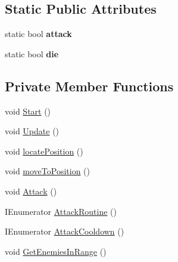\subsection*{Static Public Attributes}
\begin{DoxyCompactItemize}
\item 
\mbox{\label{class_click_to_move_a1c210864eeb2d4b60b6ca933b0aa6b2d}} 
static bool {\bfseries attack}
\item 
\mbox{\label{class_click_to_move_a263b8d7596f06f4c3cfa4219f1c728cc}} 
static bool {\bfseries die}
\end{DoxyCompactItemize}
\subsection*{Private Member Functions}
\begin{DoxyCompactItemize}
\item 
void \hyperlink{class_click_to_move_ab5f10418f80164154a69d18809fec30d}{Start} ()
\item 
void \hyperlink{class_click_to_move_aa9c5f267b0b5ad54a2444aaddec00862}{Update} ()
\item 
void \hyperlink{class_click_to_move_ad8ff402015f7fb9e9e850400ca47e47b}{locate\+Position} ()
\item 
void \hyperlink{class_click_to_move_add7581013c28bc5180a4111a196cec41}{move\+To\+Position} ()
\item 
void \hyperlink{class_click_to_move_a7a22f9529f61a4da097d950d65b5bcaa}{Attack} ()
\item 
I\+Enumerator \hyperlink{class_click_to_move_a81c5db2ca3553c2bb0cd6473437a5561}{Attack\+Routine} ()
\item 
I\+Enumerator \hyperlink{class_click_to_move_a9ec6685677f20e880a600762dd64d22a}{Attack\+Cooldown} ()
\item 
void \hyperlink{class_click_to_move_a12f6a353fabc43f592dd239da275b5e6}{Get\+Enemies\+In\+Range} ()
\end{DoxyCompactItemize}
